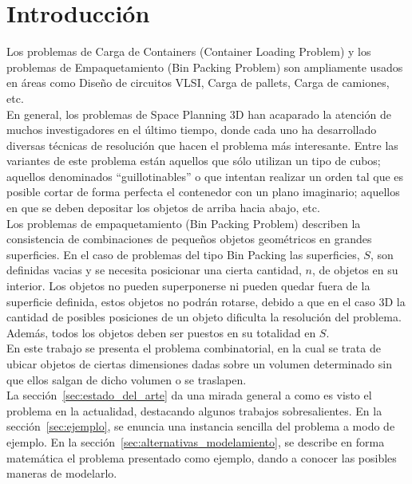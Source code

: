 \section{Introducción\label{sec:introduccion}}

Los problemas de Carga de Containers (Container Loading Problem) y
los problemas de Empaquetamiento (Bin Packing Problem) son ampliamente
usados en áreas como Diseño de circuitos VLSI, Carga de pallets, Carga
de camiones, etc. \\

En general, los problemas de Space Planning 3D han acaparado la atención
de muchos investigadores en el último tiempo, donde cada uno ha desarrollado
diversas técnicas de resolución que hacen el problema más interesante. Entre
las variantes de este problema están aquellos que sólo utilizan un tipo de cubos;
aquellos denominados ``guillotinables'' o que intentan realizar un orden tal que
es posible cortar de forma perfecta el contenedor con un plano imaginario; aquellos
en que se deben depositar los objetos de arriba hacia abajo, etc. \\

Los problemas de empaquetamiento (Bin Packing Problem) describen la
consistencia de combinaciones de pequeños objetos geométricos en grandes
superficies. En el caso de problemas del tipo Bin Packing las
superficies, $S$, son definidas vacias y se necesita posicionar una
cierta cantidad, $n$, de objetos en su interior. Los objetos no pueden
superponerse ni pueden quedar fuera de la superficie definida, estos
objetos no podrán rotarse, debido a que en el caso 3D la cantidad de
posibles posiciones de un objeto dificulta la resolución del problema.
Además, todos los objetos deben ser puestos en su totalidad en $S$. \\

En este trabajo se presenta el problema combinatorial, en la cual se
trata de ubicar objetos de ciertas dimensiones dadas sobre un volumen
determinado sin que ellos salgan de dicho volumen o se traslapen. \\

La sección~\ref{sec:estado_del_arte} da una mirada general a como es visto
el problema en la actualidad, destacando algunos trabajos sobresalientes.
En la sección~\ref{sec:ejemplo}, se enuncia una instancia sencilla del problema
a modo de ejemplo. En la sección~\ref{sec:alternativas_modelamiento}, se describe en forma
matemática el problema presentado como ejemplo, dando a conocer las
posibles maneras de modelarlo. \\

